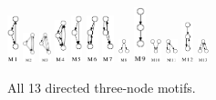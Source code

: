 \begin{figure}
  \includegraphics[width=0.03\textwidth]{M1-prc}
  \includegraphics[width=0.03\textwidth]{M2-prc}
  \includegraphics[width=0.03\textwidth]{M3-prc}
  \includegraphics[width=0.03\textwidth]{M4-prc}
  \includegraphics[width=0.03\textwidth]{M5-prc}
  \includegraphics[width=0.03\textwidth]{M6-prc}
  \includegraphics[width=0.03\textwidth]{M7-prc}
  \includegraphics[width=0.03\textwidth]{M8-prc}
  \includegraphics[width=0.03\textwidth]{M9-prc}
  \includegraphics[width=0.03\textwidth]{M10-prc}
  \includegraphics[width=0.03\textwidth]{M11-prc}
  \includegraphics[width=0.03\textwidth]{M12-prc}
  \includegraphics[width=0.03\textwidth]{M13-prc}
  \caption{All 13 directed three-node motifs.}
  \label{fig:motifs}
\end{figure}

